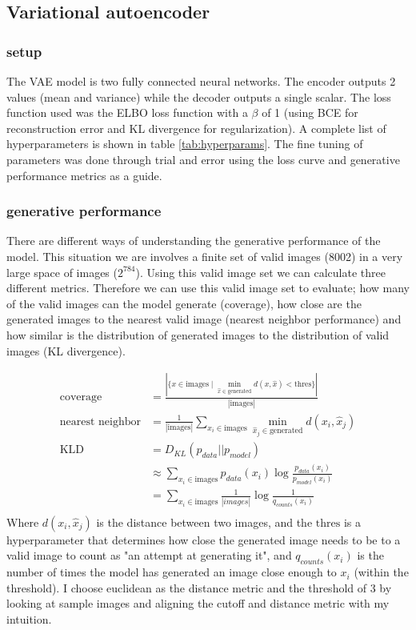 \documentclass[conference,a4paper]{IEEEtran}
\begin{document}
\subsection{Variational autoencoder}

\subsubsection{setup}

The VAE model is two fully connected neural networks. The encoder outputs 2 values (mean and variance) while the decoder outputs a single scalar. The loss function used was the ELBO loss function with a $\beta$ of 1 (using BCE for reconstruction error and KL divergence for regularization). A complete list of hyperparameters is shown in table \ref{tab:hyperparams}. The fine tuning of parameters was done through trial and error using the loss curve and generative performance metrics as a guide.

\subsubsection{generative performance}


There are different ways of understanding the generative performance of the model. This situation we are involves a finite set of valid images (8002) in a very large space of images ($2^{784}$). Using this valid image set we can calculate three different metrics.
Therefore we can use this valid image set to evaluate; how many of the valid images can the model generate (coverage), how close are the generated images to the nearest valid image (nearest neighbor performance) and how similar is the distribution of generated images to the distribution of valid images (KL divergence).

\begin{align*}
\text{coverage} &= \frac{|\{x \in \text{images} \mid \min_{\hat{x} \in \text{generated}} d(x, \hat{x}) < \text{thres}\}|}{|\text{images}|}\\
\text{nearest neighbor} &= \frac{1}{|\text{images}|} \sum_{x_i \in \text{images}} \min_{\hat{x}_j \in \text{generated}} d(x_i, \hat{x}_j)\\
\text{KLD} &= D_{KL}(p_{data} || p_{model})\\
&\approx \sum_{x_i \in \text{images}} p_{data}(x_i) \log \frac{p_{data}(x_i)}{p_{model}(x_i)}\\
&= \sum_{x_i \in \text{images}} \frac{1}{|images|} \log \frac{1}{q_{counts}(x_i)}\\
\end{align*}
Where $d(x_i, \hat{x}_j)$ is the distance between two images, and the $\text{thres}$ is a hyperparameter that determines how close the generated image needs to be to a valid image to count as "an attempt at generating it", and $q_{counts}(x_i)$ is the number of times the model has generated an image close enough to $x_i$ (within the threshold). I choose euclidean as the distance metric and the threshold of 3 by looking at sample images and aligning the cutoff and distance metric with my intuition.
\end{document}
